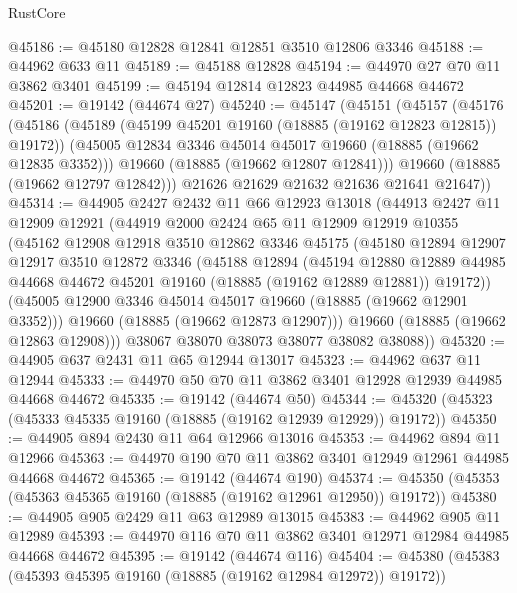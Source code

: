 \begin{lexlean}{RustCore}
\begin{coremodule}
@45186 := @45180 @12828 @12841 @12851 @3510 @12806 @3346
@45188 := @44962 @633 @11
@45189 := @45188 @12828
@45194 := @44970 @27 @70 @11 @3862 @3401
@45199 := @45194 @12814 @12823 @44985 @44668 @44672
@45201 := @19142 (@44674 @27)
@45240 := @45147
    (@45151
      (@45157
        (@45176
          (@45186
            (@45189 (@45199 @45201 @19160 (@18885 (@19162 @12823 @12815)) @19172))
            (@45005 @12834 @3346 @45014 @45017 @19660 (@18885 (@19662 @12835 @3352)))
            @19660
            (@18885 (@19662 @12807 @12841)))
          @19660
          (@18885 (@19662 @12797 @12842)))
        @21626
        @21629
        @21632
        @21636
        @21641
        @21647))
@45314 := @44905
    @2427
    @2432
    @11
    @66
    @12923
    @13018
    (@44913
      @2427
      @11
      @12909
      @12921
      (@44919
        @2000
        @2424
        @65
        @11
        @12909
        @12919
        @10355
        (@45162
          @12908
          @12918
          @3510
          @12862
          @3346
          @45175
          (@45180
            @12894
            @12907
            @12917
            @3510
            @12872
            @3346
            (@45188
              @12894
              (@45194
                @12880
                @12889
                @44985
                @44668
                @44672
                @45201
                @19160
                (@18885 (@19162 @12889 @12881))
                @19172))
            (@45005 @12900 @3346 @45014 @45017 @19660 (@18885 (@19662 @12901 @3352)))
            @19660
            (@18885 (@19662 @12873 @12907)))
          @19660
          (@18885 (@19662 @12863 @12908)))
        @38067
        @38070
        @38073
        @38077
        @38082
        @38088))
@45320 := @44905 @637 @2431 @11 @65 @12944 @13017
@45323 := @44962 @637 @11 @12944
@45333 := @44970 @50 @70 @11 @3862 @3401 @12928 @12939 @44985 @44668 @44672
@45335 := @19142 (@44674 @50)
@45344 := @45320 (@45323 (@45333 @45335 @19160 (@18885 (@19162 @12939 @12929)) @19172))
@45350 := @44905 @894 @2430 @11 @64 @12966 @13016
@45353 := @44962 @894 @11 @12966
@45363 := @44970 @190 @70 @11 @3862 @3401 @12949 @12961 @44985 @44668 @44672
@45365 := @19142 (@44674 @190)
@45374 := @45350 (@45353 (@45363 @45365 @19160 (@18885 (@19162 @12961 @12950)) @19172))
@45380 := @44905 @905 @2429 @11 @63 @12989 @13015
@45383 := @44962 @905 @11 @12989
@45393 := @44970 @116 @70 @11 @3862 @3401 @12971 @12984 @44985 @44668 @44672
@45395 := @19142 (@44674 @116)
@45404 := @45380 (@45383 (@45393 @45395 @19160 (@18885 (@19162 @12984 @12972)) @19172))

\end{coremodule}
\end{lexlean}
